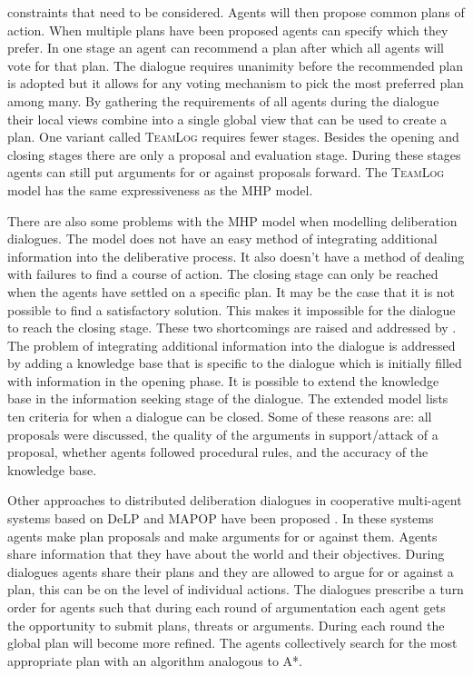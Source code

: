 constraints that need to be considered. Agents will then propose common plans
of action. When multiple plans have been proposed agents can specify which they
prefer. In one stage an agent can recommend a plan after which all agents
will vote for that plan. The dialogue requires unanimity before the recommended
plan is adopted but it allows for any voting mechanism to pick the most
preferred plan among many. By gathering the requirements of all agents during
the dialogue their local views combine into a single global view that can be
used to create a plan. One variant called \textsc{TeamLog}
\cite{dunin-keplicz2011} requires fewer stages. Besides the opening and closing
stages there are only a proposal and evaluation stage. During these stages
agents can still put arguments for or against proposals forward. The
\textsc{TeamLog} model has the same expressiveness as the MHP model.

There are also some problems with the MHP model when modelling
deliberation dialogues. The model does not have an easy method of integrating
additional information into the deliberative process. It also doesn't have a
method of dealing with failures to find a course of action. The closing stage
can only be reached when the agents have settled on a specific plan. It may be
the case that it is not possible to find a satisfactory solution. This makes it
impossible for the dialogue to reach the closing stage. These two shortcomings
are raised and addressed by \cite{walton2014}. The problem of integrating
additional information into the dialogue is addressed by adding a knowledge
base that is specific to the dialogue which is initially filled with
information in the opening phase. It is possible to extend the knowledge base
in the information seeking stage of the dialogue. The extended model lists ten
criteria for when a dialogue can be closed. Some of these reasons are: all
proposals were discussed, the quality of the arguments in support/attack of a
proposal, whether agents followed procedural rules, and the accuracy of the
knowledge base.

Other approaches to distributed deliberation dialogues in cooperative
multi-agent systems based on \textsf{DeLP} and MAPOP have been proposed 
\cite{ferrando2012,pardo2011}. In these systems agents make plan proposals and 
make arguments for or against them. Agents share information that they have 
about the world and their objectives. During dialogues agents share their plans 
and they are allowed to argue for or against a plan, this can be on the level 
of individual actions. The dialogues prescribe a turn order for agents such 
that during each round of argumentation each agent gets the opportunity to 
submit plans, threats or arguments. During each round the global plan will 
become more refined. The agents collectively search for the most appropriate 
plan with an algorithm analogous to A*.

